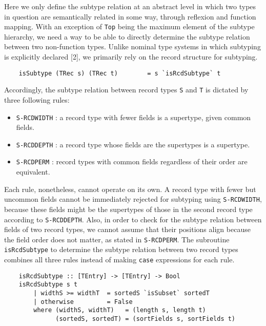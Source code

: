 \documentclass[fleqn, 11pt]{article}
\begin{document}
Here we only define the subtype relation at an abstract level in which two types in question are semantically related in some 
way, through reflexion and function mapping. With an exception of \texttt{Top} being the maximum element of the subtype hierarchy, we 
need a way to be able to directly determine the subtype relation between two non-function types. Unlike nominal type systems in 
which subtyping is explicitly declared [2], we primarily rely on the record structure for subtyping.

\begin{Verbatim}
    isSubtype (TRec s) (TRec t)        = s `isRcdSubtype` t
\end{Verbatim}

Accordingly, the subtype relation between record types \texttt{S} and \texttt{T} is dictated by three following rules:

\begin{itemize}
    \item \texttt{S-RCDWIDTH}  : a record type with fewer fields is a supertype, given common fields.
    \item \texttt{S-RCDDEPTH} : a record type whose fields are the supertypes is a supertype.
    \item \texttt{S-RCDPERM} : record types with common fields regardless of their order are equivalent.
\end{itemize}

Each rule, nonetheless, cannot operate on its own. A record type with fewer but uncommon fields cannot be immediately rejected for 
subtyping using \texttt{S-RCDWIDTH}, because these fields might be the supertypes of those in the second record type according to  
\texttt{S-RCDDEPTH}. Also, in order to check for the subtype relation between fields of two record types, we cannot assume that 
their positions align because the field order does not matter, as stated in \texttt{S-RCDPERM}. The subroutine 
\texttt{isRcdSubtype} to determine the subtype relation between two record types combines all three rules instead of 
making \texttt{case} expressions for each rule. 

\begin{Verbatim}
    isRcdSubtype :: [TEntry] -> [TEntry] -> Bool
    isRcdSubtype s t 
        | widthS >= widthT  = sortedS `isSubset` sortedT
        | otherwise         = False
        where (widthS, widthT)   = (length s, length t)
              (sortedS, sortedT) = (sortFields s, sortFields t)
\end{Verbatim}
\end{document}
